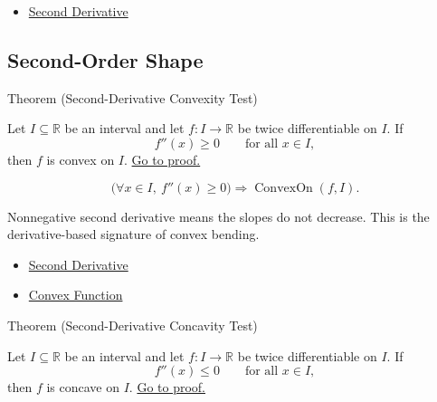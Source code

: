 \begin{dependencies}
\begin{itemize}
  \item \hyperref[def:second-derivative]{Second Derivative}
\end{itemize}
\end{dependencies}

\subsection{Second-Order Shape}

\begin{theorembox}{Theorem (Second-Derivative Convexity Test)}
\begin{theorem}
\label{thm:second-derivative-convexity-test}
Let $I\subseteq\mathbb{R}$ be an interval and let $f:I\to\mathbb{R}$ be twice differentiable on $I$. If
\[
  f''(x)\geq 0 \qquad \text{for all } x\in I,
\]
then $f$ is convex on $I$.
\hyperref[prf:second-derivative-convexity-test]{Go to proof.}
\end{theorem}
\end{theorembox}

\begin{remark*}
\[
  \bigl(\forall x\in I,\ f''(x)\geq 0\bigr)
  \Longrightarrow
  \operatorname{ConvexOn}(f,I).
\]
\end{remark*}

\begin{remark*}[Interpretation]
Nonnegative second derivative means the slopes do not decrease. This is the derivative-based signature of convex bending.
\end{remark*}

\begin{dependencies}
\begin{itemize}
  \item \hyperref[def:second-derivative]{Second Derivative}
  \item \hyperref[def:convex-function]{Convex Function}
\end{itemize}
\end{dependencies}

\begin{theorembox}{Theorem (Second-Derivative Concavity Test)}
\begin{theorem}
\label{thm:second-derivative-concavity-test}
Let $I\subseteq\mathbb{R}$ be an interval and let $f:I\to\mathbb{R}$ be twice differentiable on $I$. If
\[
  f''(x)\leq 0 \qquad \text{for all } x\in I,
\]
then $f$ is concave on $I$.
\hyperref[prf:second-derivative-concavity-test]{Go to proof.}
\end{theorem}
\end{theorembox}

